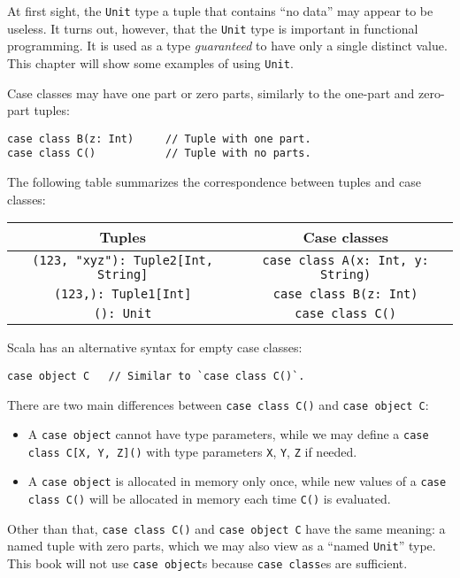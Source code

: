 At first sight, the \lstinline!Unit! type \textemdash{} a tuple that
contains ``no data'' \textemdash{} may appear to be useless. It
turns out, however, that the \lstinline!Unit! type is important in
functional programming. It is used as a type \emph{guaranteed} to
have only a single distinct value. This chapter will show some examples
of using \lstinline!Unit!.

Case classes may have one part or zero parts, similarly to the one-part
and zero-part tuples:
\begin{lstlisting}
case class B(z: Int)     // Tuple with one part.
case class C()           // Tuple with no parts.
\end{lstlisting}

The following table summarizes the correspondence between tuples and
case classes:
\begin{center}
\begin{tabular}{|c|c|}
\hline 
\textbf{\small{}Tuples} & \textbf{\small{}Case classes}\tabularnewline
\hline 
\hline 
{\small{}}\lstinline!(123, "xyz"): Tuple2[Int, String]! & {\small{}}\lstinline!case class A(x: Int, y: String)!\tabularnewline
\hline 
{\small{}}\lstinline!(123,): Tuple1[Int]! & {\small{}}\lstinline!case class B(z: Int)!\tabularnewline
\hline 
{\small{}}\lstinline!(): Unit! & {\small{}}\lstinline!case class C()!\tabularnewline
\hline 
\end{tabular}
\par\end{center}

Scala has an alternative syntax for empty case classes:
\begin{lstlisting}
case object C   // Similar to `case class C()`.
\end{lstlisting}
There are two main differences between \lstinline!case class C()!
and \lstinline!case object C!:
\begin{itemize}
\item A \lstinline!case object! cannot have type parameters, while we may
define a \lstinline!case class C[X, Y, Z]()! with type parameters
\lstinline!X!, \lstinline!Y!, \lstinline!Z! if needed.
\item A \lstinline!case object! is allocated in memory only once, while
new values of a \lstinline!case class C()! will be allocated in memory
each time \lstinline!C()! is evaluated.
\end{itemize}
Other than that, \lstinline!case class C()! and \lstinline!case object C!
have the same meaning: a named tuple with zero parts, which we may
also view as a ``named \lstinline!Unit!''
type. This book will not use \lstinline!case object!s because \lstinline!case class!es
are sufficient.


